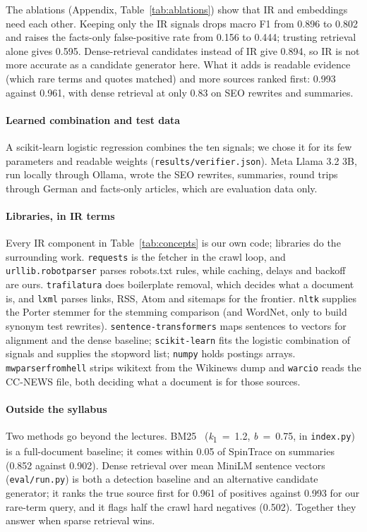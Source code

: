 \documentclass[11pt,a4paper]{article}
\newcommand{\code}[1]{\texttt{#1}}
\begin{document}
The ablations (Appendix, Table~\ref{tab:ablations}) show that IR and embeddings need each other. Keeping only the IR signals drops macro F1 from 0.896 to 0.802 and raises the facts-only false-positive rate from 0.156 to 0.444; trusting retrieval alone gives 0.595. Dense-retrieval candidates instead of IR give 0.894, so IR is not more accurate as a candidate generator here. What it adds is readable evidence (which rare terms and quotes matched) and more sources ranked first: 0.993 against 0.961, with dense retrieval at only 0.83 on SEO rewrites and summaries.

\paragraph{Learned combination and test data} A scikit-learn logistic regression combines the ten signals; we chose it for its few parameters and readable weights (\code{results/verifier.json}). Meta Llama 3.2 3B, run locally through Ollama, wrote the SEO rewrites, summaries, round trips through German and facts-only articles, which are evaluation data only.

\paragraph{Libraries, in IR terms} Every IR component in Table~\ref{tab:concepts} is our own code; libraries do the surrounding work. \code{requests} is the fetcher in the crawl loop, and \code{urllib.robotparser} parses robots.txt rules, while caching, delays and backoff are ours. \code{trafilatura} does boilerplate removal, which decides what a document is, and \code{lxml} parses links, RSS, Atom and sitemaps for the frontier. \code{nltk} supplies the Porter stemmer for the stemming comparison (and WordNet, only to build synonym test rewrites). \code{sentence-transformers} maps sentences to vectors for alignment and the dense baseline; \code{scikit-learn} fits the logistic combination of signals and supplies the stopword list; \code{numpy} holds postings arrays. \code{mwparserfromhell} strips wikitext from the Wikinews dump and \code{warcio} reads the CC-NEWS file, both deciding what a document is for those sources.

\paragraph{Outside the syllabus} Two methods go beyond the lectures. BM25~\cite{robertson2009} (\textit{k}\textsubscript{1}~=~1.2, \textit{b}~=~0.75, in \code{index.py}) is a full-document baseline; it comes within 0.05 of SpinTrace on summaries (0.852 against 0.902). Dense retrieval over mean MiniLM sentence vectors (\code{eval/run.py}) is both a detection baseline and an alternative candidate generator; it ranks the true source first for 0.961 of positives against 0.993 for our rare-term query, and it flags half the crawl hard negatives (0.502). Together they answer when sparse retrieval wins.
\end{document}
